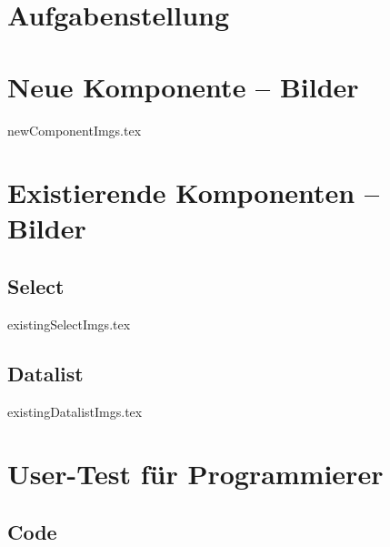 \chapter{Aufgabenstellung}
\label{chap:task}





\chapter{Neue Komponente – Bilder}
\label{chap:newImgs}

\graphicspath{ {./img/newComponent/} }
{newComponentImgs.tex}
\graphicspath{ {./img/} }



\chapter{Existierende Komponenten – Bilder}
\label{chap:existingImgs}


\section*{Select}
\graphicspath{ {./img/select/} }
{existingSelectImgs.tex}
\graphicspath{ {./img/} }

\clearpage
\section*{Datalist}
\graphicspath{ {./img/datalist/} }
{existingDatalistImgs.tex}
\graphicspath{ {./img/} }



\chapter{User-Test für Programmierer}
\label{chap:userTestProgrammers}


\section*{Code}

